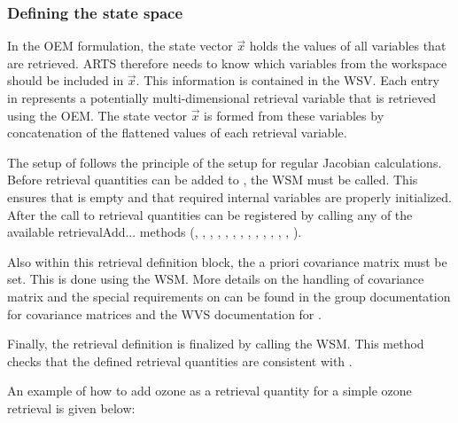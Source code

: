 \subsubsection{Defining the state space}

In the OEM formulation, the state vector $\vec{x}$ holds the values of all variables
that are retrieved.  ARTS therefore needs to know which variables from
the workspace should be included in  $\vec{x}$. This information is contained in the
 WSV. Each entry in 
represents a potentially multi-dimensional retrieval variable that is retrieved
using the OEM. The state vector $\vec{x}$ is formed from these variables by concatenation
of the flattened values of each retrieval variable.

The setup of  follows the principle of the setup for
regular Jacobian calculations. Before retrieval quantities can be added to
, the  WSM must be called.
This ensures that  is empty and that  required
internal variables are properly initialized. After the call to
  retrieval quantities can be registered by calling
 any of the available retrievalAdd... methods (, 
, ,
 , ,
, ,
, ,
, ,
, ,
).

Also within this retrieval definition block, the a priori covariance matrix
  must be set. This is done using the
 WSM. More details on the handling of
covariance matrix and the special requirements on 
can be found in the group documentation for covariance matrices and
the WVS documentation for .

Finally, the retrieval definition is finalized by calling the
  WSM. This method checks that the defined
retrieval quantities are consistent with .

An example of how to add ozone as a retrieval quantity for a simple ozone
retrieval is given below:

